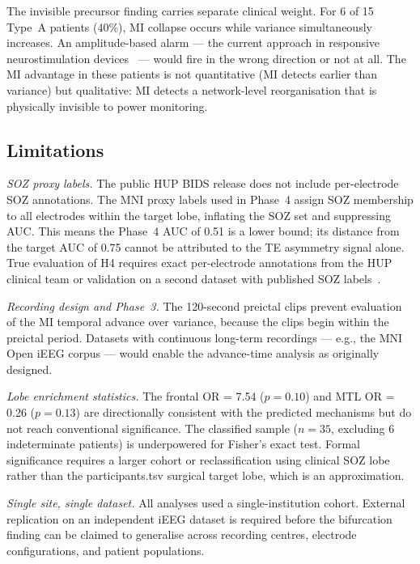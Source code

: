 \documentclass[final,5p,times,twocolumn]{elsarticle}
\begin{document}
The invisible precursor finding carries separate clinical weight.
%
For 6 of 15 Type~A patients (40\%), MI collapse occurs while variance
simultaneously increases.
%
An amplitude-based alarm --- the current approach in responsive
neurostimulation devices~\cite{bergey2015} --- would fire in the wrong
direction or not at all.
%
The MI advantage in these patients is not quantitative (MI detects
earlier than variance) but qualitative: MI detects a network-level
reorganisation that is physically invisible to power monitoring.

\subsection{Limitations}
\label{sec:limitations}

\textit{SOZ proxy labels.}
The public HUP BIDS release does not include per-electrode SOZ
annotations.
%
The MNI proxy labels used in Phase~4 assign SOZ membership to all
electrodes within the target lobe, inflating the SOZ set and
suppressing AUC.
%
This means the Phase~4 AUC of 0.51 is a lower bound; its distance from
the target AUC of 0.75 cannot be attributed to the TE asymmetry signal
alone.
%
True evaluation of H4 requires exact per-electrode annotations from the
HUP clinical team or validation on a second dataset with published SOZ
labels~\cite{wagenaar2015}.

\textit{Recording design and Phase~3.}
The 120-second preictal clips prevent evaluation of the MI temporal
advance over variance, because the clips begin within the preictal
period.
%
Datasets with continuous long-term recordings --- e.g., the MNI Open
iEEG corpus --- would enable the advance-time analysis as originally
designed.

\textit{Lobe enrichment statistics.}
The frontal OR = 7.54 ($p = 0.10$) and MTL OR = 0.26 ($p = 0.13$) are
directionally consistent with the predicted mechanisms but do not reach
conventional significance.
%
The classified sample ($n = 35$, excluding 6 indeterminate patients)
is underpowered for Fisher's exact test.
%
Formal significance requires a larger cohort or reclassification using
clinical SOZ lobe rather than the participants.tsv surgical target
lobe, which is an approximation.

\textit{Single site, single dataset.}
All analyses used a single-institution cohort.
%
External replication on an independent iEEG dataset is required before
the bifurcation finding can be claimed to generalise across recording
centres, electrode configurations, and patient populations.
\end{document}
